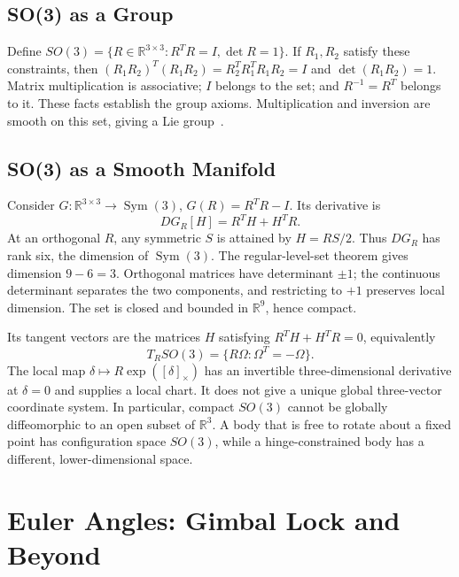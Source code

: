 \subsection{SO(3) as a Group}
\label{def:SO3_group}
\label{thm:SO3_is_group}

Define $SO(3)=\{R\in\mathbb R^{3\times3}:R^TR=I,\det R=1\}$. If $R_1,R_2$ satisfy these constraints, then $(R_1R_2)^T(R_1R_2)=R_2^TR_1^TR_1R_2=I$ and $\det(R_1R_2)=1$. Matrix multiplication is associative; $I$ belongs to the set; and $R^{-1}=R^T$ belongs to it. These facts establish the group axioms. Multiplication and inversion are smooth on this set, giving a Lie group~\cite{Murray1994}.

\subsection{SO(3) as a Smooth Manifold}
\label{thm:SO3_manifold}
\label{princ:so3_principle}

Consider $G:\mathbb R^{3\times3}\to\operatorname{Sym}(3)$, $G(R)=R^TR-I$. Its derivative is
\begin{equation}
 DG_R[H]=R^TH+H^TR.
 \label{eq:rotation_constraint_derivative}
\end{equation}
At an orthogonal $R$, any symmetric $S$ is attained by $H=RS/2$. Thus $DG_R$ has rank six, the dimension of $\operatorname{Sym}(3)$. The regular-level-set theorem gives dimension $9-6=3$. Orthogonal matrices have determinant $\pm1$; the continuous determinant separates the two components, and restricting to $+1$ preserves local dimension. The set is closed and bounded in $\mathbb R^9$, hence compact.

Its tangent vectors are the matrices $H$ satisfying $R^TH+H^TR=0$, equivalently
\begin{equation}
 T_RSO(3)=\{R\Omega:\Omega^T=-\Omega\}.
 \label{eq:rotation_tangent_space}
\end{equation}
The local map $\delta\mapsto R\exp([\delta]_\times)$ has an invertible three-dimensional derivative at $\delta=0$ and supplies a local chart. It does not give a unique global three-vector coordinate system. In particular, compact $SO(3)$ cannot be globally diffeomorphic to an open subset of $\mathbb R^3$. A body that is free to rotate about a fixed point has configuration space $SO(3)$, while a hinge-constrained body has a different, lower-dimensional space.

\section{Euler Angles: Gimbal Lock and Beyond}
\label{sec:euler_angles}

